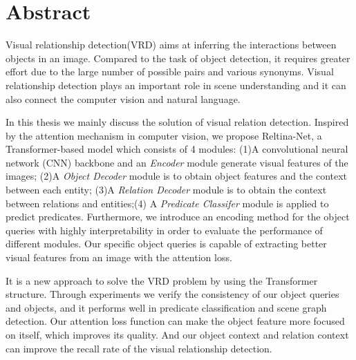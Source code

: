 \chapter*{Abstract}
\label{chap:Abstract}
\setcounter{page}{1}
Visual relationship detection(VRD) aims at inferring the interactions between objects in an image. Compared to the task of object detection, it requires greater effort due to the large number of possible pairs and various synonyms. Visual relationship detection plays an important role in scene understanding and it can also connect the computer vision and natural language. 

In this thesis we mainly discuss the solution of visual relation detection. Inspired by the attention mechanism in computer vision, we propose Reltina-Net, a Transformer-based model which consists of 4 modules: (1)A convolutional neural network (CNN) backbone and an \textit{Encoder} module generate visual features of the images; (2)A \textit{Object Decoder} module is to obtain object features and  the context between each entity; (3)A \textit{Relation Decoder} module is to obtain the context between relations and entities;(4) A \textit{Predicate Classifer} module is applied to predict predicates. Furthermore, we introduce an encoding method for the object queries with highly interpretability in order to evaluate the performance of different modules. Our specific object queries is capable of extracting better visual features from an image with the attention loss. 

It is a new approach to solve the VRD problem by using the Transformer structure.  Through experiments we verify the consistency of our object queries and objects, and it performs well in predicate classification and scene graph detection. Our attention loss function can make the object feature more focused on itself, which improves its quality. And our object context and relation context can improve the recall rate of the visual relationship detection.


